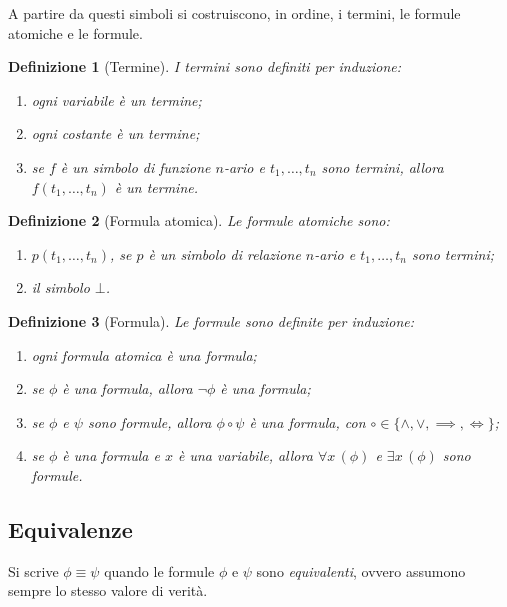 \documentclass[a4paper, 11pt, oneside]{book}
\theoremstyle{formale}
\newtheorem*{definition}{Definizione}
\begin{document}
    A partire da questi simboli si costruiscono, in ordine, i termini, le formule atomiche
    e le formule.

    \begin{definition}[Termine]
        I \emph{termini} sono definiti per induzione:
        \begin{enumerate}
            \item ogni variabile \`e un termine;
            \item ogni costante \`e un termine;
            \item se $f$ \`e un simbolo di funzione $n$-ario e $t_1, \dots, t_n$ sono
                termini, allora $f(t_1, \dots, t_n)$ \`e un termine.
        \end{enumerate}
    \end{definition}

    \begin{definition}[Formula atomica]
        Le \emph{formule atomiche} sono:
        \begin{enumerate}
            \item $p(t_1, \dots, t_n)$, se $p$ \`e un simbolo di relazione $n$-ario e
                $t_1, \dots, t_n$ sono termini;
            \item il simbolo $\bot$.
        \end{enumerate}
    \end{definition}

    \begin{definition}[Formula]
        Le \emph{formule} sono definite per induzione:
        \begin{enumerate}
            \item ogni formula atomica \`e una formula;
            \item se $\phi$ \`e una formula, allora $\neg \phi$ \`e una formula;
            \item se $\phi$ e $\psi$ sono formule, allora $\phi \circ \psi$ \`e una formula,
                con $\circ \in \{\land, \lor, \implies, \iff\}$;
            \item se $\phi$ \`e una formula e $x$ \`e una variabile, allora
                $\forall x \, (\phi)$ e $\exists x \, (\phi)$ sono formule.
        \end{enumerate}
    \end{definition}

    \subsection{Equivalenze}
    \label{sec:equivalenze}
    Si scrive $\phi \equiv \psi$ quando le formule $\phi$ e $\psi$ sono
    \emph{equivalenti}, ovvero assumono sempre lo stesso valore di verit\`a.
\end{document}
